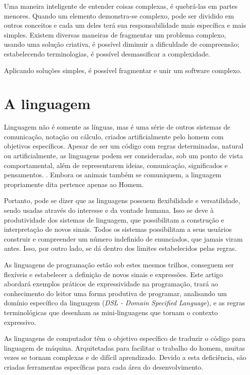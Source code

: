 \documentclass[espaco=simples,appendix=Name]{abnt}
\begin{document}
Uma maneira inteligente de entender coisas complexas, é quebrá-las em partes menores. Quando um elemento demonstra-se complexo, pode ser dividido em outros conceitos e cada um deles terá sua responsabilidade mais específica e mais simples. Existem diversas maneiras de fragmentar um problema complexo, usando uma solução criativa, é possível diminuir a dificuldade de compreensão; estabelecendo terminologias, é possível desmassificar a complexidade.\cite{NazemiExpressiveCode}

Aplicando soluções simples, é possível fragmentar e unir um software complexo.


\chapter{A linguagem}


Linguagem não é somente as línguas, mas é uma série de outros sistemas de comunicação, notação ou cálculo, criados artificialmente pelo homem com objetivos específicos. Apesar de ser um código com regras determinadas, natural ou artificialmente, as linguagens podem ser consideradas, sob um ponto de vista comportamental, além de representarem ideias, comunicação, significados e pensamentos. \cite{linguagemLinguistica}. Embora os animais também se comuniquem, a linguagem propriamente dita pertence apenas ao Homem\cite{wikiLinguagem}.


Portanto, pode se dizer que as linguagens possuem flexibilidade e versatilidade, sendo usadas através do interesse e da vontade humana. Isso se deve à produtividade dos sistemas de linguagem, que possibilitam a construção e interpretação de novos sinais. Todos os sistemas possibilitam a seus usuários construir e compreender um número indefinido de enunciados, que jamais viram antes. Isso, por outro lado, se dá dentro dos limites estabelecidos pelas regras.

As linguagens de programação estão sob estes mesmos trilhos, conseguem ser flexíveis e estabelecer a definição de novos sinais e expressões. Este artigo abordará exemplos práticos de expressividade na programação, trará ao conhecimento do leitor uma forma produtiva de programar, analisando um domínio específico da linguagem (\textit{DSL - Domain Specified Language}), e as regras terminológicas que desenham as mini-linguagens que tornam o contexto expressivo.

As linguagens de computador têm o objetivo específico de traduzir o código para linguagem de máquina. Arquitetadas para facilitar o trabalho do homem, muitas vezes se tornam complexas e de difícil aprendizado. Devido a esta deficiência, são criadas ferramentas específicas para cada área do desenvolvimento. 
\end{document}
